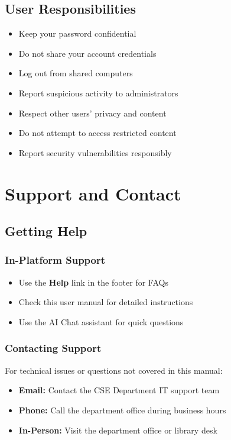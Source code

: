\documentclass[12pt,a4paper]{article}
\begin{document}
\subsection{User Responsibilities}
\begin{itemize}[leftmargin=*]
    \item Keep your password confidential
    \item Do not share your account credentials
    \item Log out from shared computers
    \item Report suspicious activity to administrators
    \item Respect other users' privacy and content
    \item Do not attempt to access restricted content
    \item Report security vulnerabilities responsibly
\end{itemize}

\newpage

\section{Support and Contact}

\subsection{Getting Help}

\subsubsection{In-Platform Support}
\begin{itemize}[leftmargin=*]
    \item Use the \textbf{Help} link in the footer for FAQs
    \item Check this user manual for detailed instructions
    \item Use the AI Chat assistant for quick questions
\end{itemize}

\subsubsection{Contacting Support}
For technical issues or questions not covered in this manual:
\begin{itemize}[leftmargin=*]
    \item \textbf{Email:} Contact the CSE Department IT support team
    \item \textbf{Phone:} Call the department office during business hours
    \item \textbf{In-Person:} Visit the department office or library desk
\end{itemize}
\end{document}
